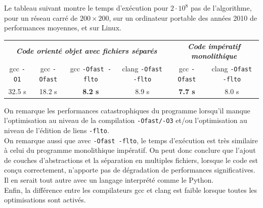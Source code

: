 \documentclass{book}
\begin{document}
\begin{correction}
Le tableau suivant montre le temps d'exécution pour $2\cdot 10^8$ pas de l'algorithme, pour un réseau carré de $200 \times 200$, sur un ordinateur portable des années 2010 de performances moyennes, et sur Linux.
\begin{table}[H]
\hspace*{-0.45cm}%
\begin{tabular}{cccc|cc}
\hline
\multicolumn{4}{c|}{\textit{\textbf{Code orienté objet avec fichiers séparés}}}                                                                                 & \multicolumn{2}{c}{\textit{\textbf{Code impératif monolithique}}}      \\
\multicolumn{1}{c|}{gcc \texttt{-O1}} & \multicolumn{1}{c|}{gcc \texttt{-Ofast}} & \multicolumn{1}{c|}{gcc \texttt{-Ofast -flto}} & clang \texttt{-Ofast -flto} & \multicolumn{1}{c|}{gcc \texttt{-Ofast}} & clang \texttt{-Ofast -flto} \\ \hline
\multicolumn{1}{c|}{32.5 s}           & \multicolumn{1}{c|}{18.2 s}              & \multicolumn{1}{c|}{\textbf{8.2 s}}            & 8.9 s                       & \multicolumn{1}{c|}{\textbf{7.7 s}}      & 8.0 s                       \\ \hline
\end{tabular}
\end{table}
On remarque les performances catastrophiques du programme lorsqu'il manque l'optimisation au niveau de la compilation \texttt{-Ofast/-O3} et/ou l'optimisation au niveau de l'édition de liens \texttt{-flto}.\\

On remarque aussi que avec \texttt{-Ofast -flto}, le temps d'exécution est très similaire à celui du programme monolithique impératif. On peut donc conclure que l'ajout de couches d'abstractions et la séparation en multiples fichiers, lorsque le code est conçu correctement, n'apporte pas de dégradation de performances significatives. Il en serait tout autre avec un langage interprété comme le Python.\\

Enfin, la différence entre les compilateurs gcc et clang est faible lorsque toutes les optimisations sont activés.
\end{correction}
\end{document}
